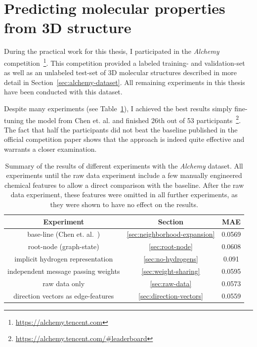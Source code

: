\section{Predicting molecular properties from 3D structure}
\label{sec:alchemy}

During the practical work for this thesis, I participated in the \textit{Alchemy} competition~\footnote{\url{https://alchemy.tencent.com}}. This competition provided a labeled training- and validation-set as well as an unlabeled test-set of 3D molecular structures described in more detail in Section~\ref{sec:alchemy-dataset}. All remaining experiments in this thesis have been conducted with this dataset.

Despite many experiments (see Table~\ref{tab:alchemy-results}), I achieved the best results simply fine-tuning the model from Chen et. al.\cite{Chen2019} and finished 26th out of 53 participants~\footnote{\url{https://alchemy.tencent.com/\#leaderboard}}. The fact that half the participants did not beat the baseline published in the official competition paper shows that the approach is indeed quite effective and warrants a closer examination.




\begin{table}[H]
\begin{centering}
	\begin{tabular}{||c | c | c||} 
		\hline
		\textbf{Experiment} & \textbf{Section} & \textbf{MAE} \\ [0.5ex] 
		\hline\hline
		base-line (Chen et. al.~\cite{Chen2019})  & \ref{sec:neighborhood-expansion} & 0.0569 \\
		root-node (graph-state) & \ref{sec:root-node} & 0.0608 \\ 
		implicit hydrogen representation & \ref{sec:no-hydrogens} & 0.091 \\
		independent message passing weights & \ref{sec:weight-sharing} & 0.0595 \\
		raw data only & \ref{sec:raw-data} & 0.0573 \\
		direction vectors as edge-features & \ref{sec:direction-vectors} & 0.0559 \\ [1ex] 
		\hline
	\end{tabular}
	\vspace{0.5cm}
	\caption{Summary of the results of different experiments with the \textit{Alchemy} dataset. All experiments until the raw data experiment include a few manually engineered chemical features to allow a direct comparison with the baseline. After the raw data experiment, these features were omitted in all further experiments, as they were shown to have no effect on the results.}
	\label{tab:alchemy-results}
\end{centering}
\end{table}


